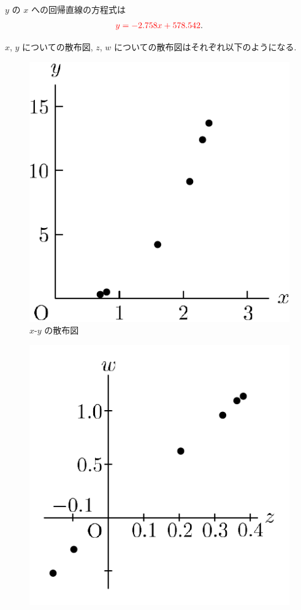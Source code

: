 \begin{qenumerate}
{		$y$ の $x$ への回帰直線の方程式は
		\begin{align}
			\textcolor{red}{y = -2.758x + 578.542}.
		\end{align}
	}
	\item{
		$x$, $y$ についての散布図, $z$, $w$ についての散布図はそれぞれ以下のようになる.
		\begin{figure}[H]
			\centering
			\begin{minipage}{0.49\columnwidth}
				\centering
				\includegraphics[scale = 0.5]{./figure/102-1.pdf} \\
				$x$-$y$ の散布図
			\end{minipage}
			\begin{minipage}{0.49\columnwidth}
				\centering
				\includegraphics[scale = 0.5]{./figure/102-2.pdf} \\

\end{minipage}
\end{figure}}
\end{qenumerate}
